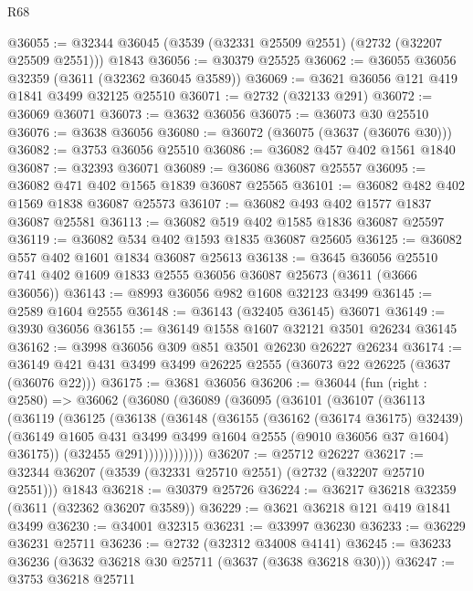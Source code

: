 \begin{lexlean}{R68}
\begin{coremodule}
@36055 := @32344 @36045 (@3539 (@32331 @25509 @2551) (@2732 (@32207 @25509 @2551))) @1843
@36056 := @30379 @25525
@36062 := @36055 @36056 @32359 (@3611 (@32362 @36045 @3589))
@36069 := @3621 @36056 @121 @419 @1841 @3499 @32125 @25510
@36071 := @2732 (@32133 @291)
@36072 := @36069 @36071
@36073 := @3632 @36056
@36075 := @36073 @30 @25510
@36076 := @3638 @36056
@36080 := @36072 (@36075 (@3637 (@36076 @30)))
@36082 := @3753 @36056 @25510
@36086 := @36082 @457 @402 @1561 @1840
@36087 := @32393 @36071
@36089 := @36086 @36087 @25557
@36095 := @36082 @471 @402 @1565 @1839 @36087 @25565
@36101 := @36082 @482 @402 @1569 @1838 @36087 @25573
@36107 := @36082 @493 @402 @1577 @1837 @36087 @25581
@36113 := @36082 @519 @402 @1585 @1836 @36087 @25597
@36119 := @36082 @534 @402 @1593 @1835 @36087 @25605
@36125 := @36082 @557 @402 @1601 @1834 @36087 @25613
@36138 := @3645
    @36056
    @25510
    @741
    @402
    @1609
    @1833
    @2555
    @36056
    @36087
    @25673
    (@3611 (@3666 @36056))
@36143 := @8993 @36056 @982 @1608 @32123 @3499
@36145 := @2589 @1604 @2555
@36148 := @36143 (@32405 @36145) @36071
@36149 := @3930 @36056
@36155 := @36149 @1558 @1607 @32121 @3501 @26234 @36145
@36162 := @3998 @36056 @309 @851 @3501 @26230 @26227 @26234
@36174 := @36149 @421 @431 @3499 @3499 @26225 @2555 (@36073 @22 @26225 (@3637 (@36076 @22)))
@36175 := @3681 @36056
@36206 := @36044
    (fun (right : @2580) =>
    @36062
      (@36080
        (@36089
          (@36095
            (@36101
              (@36107
                (@36113
                  (@36119
                    (@36125
                      (@36138
                        (@36148
                          (@36155
                            (@36162 (@36174 @36175) @32439)
                            (@36149
                              @1605
                              @431
                              @3499
                              @3499
                              @1604
                              @2555
                              (@9010 @36056 @37 @1604)
                              @36175))
                          (@32455 @291))))))))))))
@36207 := @25712 @26227
@36217 := @32344 @36207 (@3539 (@32331 @25710 @2551) (@2732 (@32207 @25710 @2551))) @1843
@36218 := @30379 @25726
@36224 := @36217 @36218 @32359 (@3611 (@32362 @36207 @3589))
@36229 := @3621 @36218 @121 @419 @1841 @3499
@36230 := @34001 @32315
@36231 := @33997 @36230
@36233 := @36229 @36231 @25711
@36236 := @2732 (@32312 @34008 @4141)
@36245 := @36233 @36236 (@3632 @36218 @30 @25711 (@3637 (@3638 @36218 @30)))
@36247 := @3753 @36218 @25711

\end{coremodule}
\end{lexlean}
